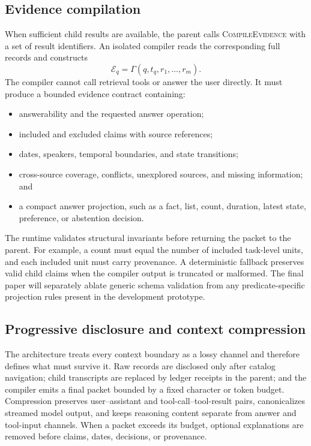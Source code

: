 \documentclass{article}
\begin{document}
\subsection{Evidence compilation}

When sufficient child results are available, the parent calls
\textsc{CompileEvidence} with a set of result identifiers. An isolated compiler
reads the corresponding full records and constructs
\begin{equation}
    \mathcal{E}_q = \Gamma(q,t_q,r_1,\ldots,r_m).
\end{equation}
The compiler cannot call retrieval tools or answer the user directly. It must
produce a bounded evidence contract containing:
\begin{itemize}
    \item answerability and the requested answer operation;
    \item included and excluded claims with source references;
    \item dates, speakers, temporal boundaries, and state transitions;
    \item cross-source coverage, conflicts, unexplored sources, and missing
    information; and
    \item a compact answer projection, such as a fact, list, count, duration,
    latest state, preference, or abstention decision.
\end{itemize}

The runtime validates structural invariants before returning the packet to the
parent. For example, a count must equal the number of included task-level units,
and each included unit must carry provenance. A deterministic fallback preserves
valid child claims when the compiler output is truncated or malformed. The
final paper will separately ablate generic schema validation from any
predicate-specific projection rules present in the development prototype.

\subsection{Progressive disclosure and context compression}

The architecture treats every context boundary as a lossy channel and therefore
defines what must survive it. Raw records are disclosed only after catalog
navigation; child transcripts are replaced by ledger receipts in the parent;
and the compiler emits a final packet bounded by a fixed character or token
budget. Compression preserves user--assistant and tool-call--tool-result pairs,
canonicalizes streamed model output, and keeps reasoning content separate from
answer and tool-input channels. When a packet exceeds its budget, optional
explanations are removed before claims, dates, decisions, or provenance.
\end{document}

